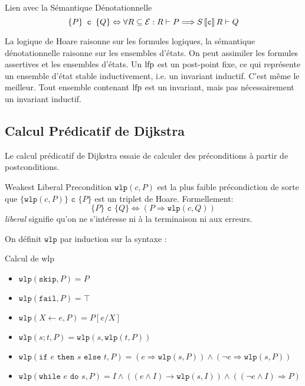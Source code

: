 \documentclass{cours}
\begin{document}
\begin{théorème}
	{Lien avec la Sémantique Dénotationnelle}{}
	\begin{equation*}
		\{P\} \texttt{ c } \{Q\} \Leftrightarrow \forall R \subseteq \mathcal{E}: R \vdash P \Longrightarrow S\left\llbracket \texttt{c} \right\rrbracket R \vdash Q
	\end{equation*}
\end{théorème}
La logique de Hoare raisonne sur les formules logiques, la sémantique dénotationnelle raisonne sur les ensembles d'états. 
On peut assimiler les formules assertives et les ensembles d'états. 
Un $\operatorname{lfp}$ est un post-point fixe, ce qui représente un ensemble d'état stable inductivement, i.e. un invariant inductif. 
C'est même le meilleur. Tout ensemble contenant $\operatorname{lfp}$ est un invariant, mais pas nécessairement un invariant inductif. 

\subsection{Calcul Prédicatif de Dijkstra}
Le calcul prédicatif de Dijkstra essaie de calculer des préconditions à partir de postconditions.
\newcommand{\wlp}{\texttt{wlp}}
\begin{définition}
	{Weakest Liberal Precondition}{}
	$\wlp(c, P)$ est la plus faible précondiction de sorte que $\{\wlp(c, P)\} \texttt{ c } \{P\}$ est un triplet de Hoare. 
	Formellement: 
	\begin{equation*}
		\{P\} \texttt{ c } \{Q\} \Leftrightarrow \left(P \Rightarrow \wlp(c, Q)\right)
	\end{equation*}
	\textit{liberal} signifie qu'on ne s'intéresse ni à la terminaison ni aux erreurs. 
\end{définition}

On définit $\wlp$ par induction sur la syntaxe : 
\begin{définition}
	{Calcul de wlp}{}
	\begin{itemize}
		\item $\wlp(\texttt{skip}, P) = P$
		\item $\wlp(\texttt{fail}, P) = \top$
		\item $\wlp(X \gets e, P) = P[e/X]$
		\item $\wlp(s;t, P) = \wlp(s, \wlp(t, P))$
		\item $\wlp(\texttt{if } e \texttt{ then } s \texttt{ else } t, P) = (e \Rightarrow \wlp(s, P)) \land \left(\lnot e \Rightarrow \wlp(s, P)\right)$
		\item $\wlp(\texttt{while } e \texttt{ do } s, P) = I \land \left(\left(e\land I\right) \rightarrow \wlp(s, I) \right) \land \left(\left(\lnot e \land I\right) \Rightarrow P \right)$
	\end{itemize}
\end{définition}
\end{document}
